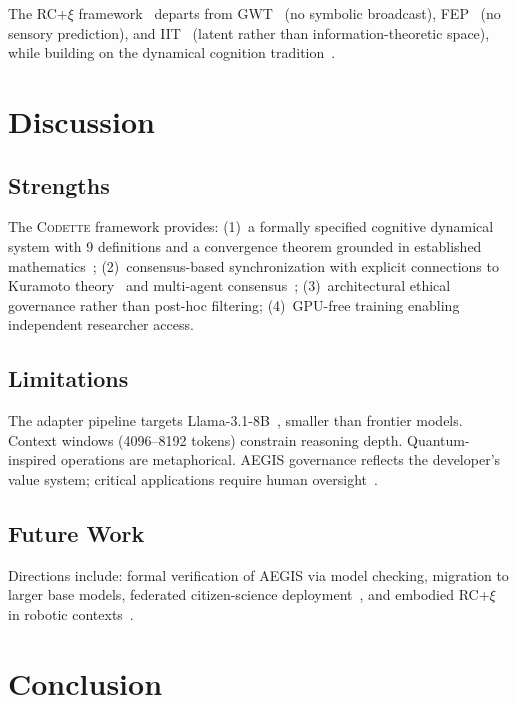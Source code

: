 \documentclass[conference]{IEEEtran}
\newcommand{\codette}{\textsc{Codette}}
\begin{document}
The RC+$\xi$ framework~\cite{harrison2026codettefull} departs from GWT~\cite{baars1997theatre} (no symbolic broadcast), FEP~\cite{friston2010free} (no sensory prediction), and IIT~\cite{tononi2004information} (latent rather than information-theoretic space), while building on the dynamical cognition tradition~\cite{beer2000dynamical,kelso1995dynamic}.

\section{Discussion}
\label{sec:discussion}

\subsection{Strengths}
The \codette{} framework provides: (1)~a formally specified cognitive dynamical system with 9 definitions and a convergence theorem grounded in established mathematics~\cite{khalil2002nonlinear,strogatz2015nonlinear}; (2)~consensus-based synchronization with explicit connections to Kuramoto theory~\cite{kuramoto1984chemical} and multi-agent consensus~\cite{olfatisaber2007consensus}; (3)~architectural ethical governance rather than post-hoc filtering; (4)~GPU-free training enabling independent researcher access.

\subsection{Limitations}
The adapter pipeline targets Llama-3.1-8B~\cite{grattafiori2024llama}, smaller than frontier models. Context windows (4096--8192 tokens) constrain reasoning depth. Quantum-inspired operations are metaphorical. AEGIS governance reflects the developer's value system; critical applications require human oversight~\cite{harrison2026codettefull}.

\subsection{Future Work}
Directions include: formal verification of AEGIS via model checking, migration to larger base models, federated citizen-science deployment~\cite{harrison2025citizenscience}, and embodied RC+$\xi$ in robotic contexts~\cite{harrison2026codettefull}.

\section{Conclusion}
\label{sec:conclusion}
\end{document}
